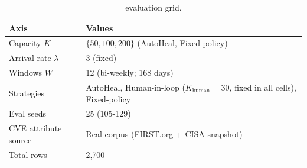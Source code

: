\begin{table}[!t]
 \caption{evaluation grid.}
 \label{tab:grid}
 \centering
 \small
 \setlength{\tabcolsep}{4pt}
 \begin{tabular}{@{}p{2.5cm}p{4.7cm}@{}}
 \toprule
 \textbf{Axis} & \textbf{Values} \\
 \midrule
 Capacity $K$ & $\{50, 100, 200\}$ (AutoHeal, Fixed-policy) \\
 Arrival rate $\lambda$ & 3 (fixed) \\
 Windows $W$ & 12 (bi-weekly; 168 days) \\
 Strategies & AutoHeal, Human-in-loop ($K_{\text{human}}=30$, fixed in all cells), Fixed-policy \\
 Eval seeds & 25 (105-129) \\
 CVE attribute source & Real corpus (FIRST.org + CISA snapshot) \\
 \midrule
 Total rows & 2{,}700 \\
 \bottomrule
 \end{tabular}
\end{table}
